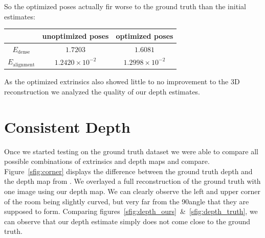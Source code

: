         So the optimized poses actually fir worse to the ground truth than the initial estimates:
        \begin{center}
            \begin{tabular}[]{c | c | c}
                & unoptimized poses & optimized poses\\
                \hline
                $E_{\text{dense}}$ & $1.7203$ & $1.6081$\\
                \hline
                $E_{\text{alignment}}$ & $1.2420\times10^{-2}$ & $1.2998\times10^{-2}$
            \end{tabular}
        \end{center}
        As the optimized extrinsics also showed little to no improvement to the 3D reconstruction we analyzed the quality of our depth estimates.
    \section{Consistent Depth}
        Once we started testing on the ground truth dataset we were able to compare all possible combinations of extrinsics and depth maps and compare.
        Figure~\ref{sfig:corner} displays the difference between the ground truth depth and the depth map from .
        We overlayed a full reconstruction of the ground truth with one image using our depth map.
        We can clearly observe the left and upper corner of the room being slightly curved, but very far from the 90\textdegree angle that they are supposed to form.
        Comparing figures~\ref{sfig:depth_ours}~\&~\ref{sfig:depth_truth}, we can observe that our depth estimate simply does not come close to the ground truth.\\
